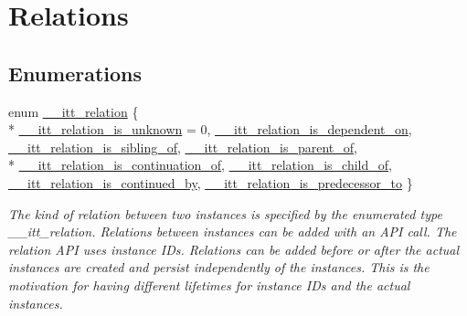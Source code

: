 \hypertarget{group__relations}{\section{Relations}
\label{group__relations}
}
\subsection*{Enumerations}
\begin{DoxyCompactItemize}
\item 
enum \hyperlink{group__relations_ga2f588e0d778ac0cca7cc0b64cfb1bdca}{\-\_\-\-\_\-itt\-\_\-relation} \{ \\*
\hyperlink{group__relations_gga2f588e0d778ac0cca7cc0b64cfb1bdcaa1a459a9e26ce70786921b894dca23272}{\-\_\-\-\_\-itt\-\_\-relation\-\_\-is\-\_\-unknown} = 0, 
\hyperlink{group__relations_gga2f588e0d778ac0cca7cc0b64cfb1bdcaa04baff009ada30040481b41a79f4f593}{\-\_\-\-\_\-itt\-\_\-relation\-\_\-is\-\_\-dependent\-\_\-on}, 
\hyperlink{group__relations_gga2f588e0d778ac0cca7cc0b64cfb1bdcaab47399cff08b5c6b90fd5db7d06f46c2}{\-\_\-\-\_\-itt\-\_\-relation\-\_\-is\-\_\-sibling\-\_\-of}, 
\hyperlink{group__relations_gga2f588e0d778ac0cca7cc0b64cfb1bdcaa157629a13cd4b3fda5a0ebaab75fe707}{\-\_\-\-\_\-itt\-\_\-relation\-\_\-is\-\_\-parent\-\_\-of}, 
\\*
\hyperlink{group__relations_gga2f588e0d778ac0cca7cc0b64cfb1bdcaa1e41b50db9c794d31bdcd594993b4b6f}{\-\_\-\-\_\-itt\-\_\-relation\-\_\-is\-\_\-continuation\-\_\-of}, 
\hyperlink{group__relations_gga2f588e0d778ac0cca7cc0b64cfb1bdcaa0996403dd9c42c69163e2c6321d5cf37}{\-\_\-\-\_\-itt\-\_\-relation\-\_\-is\-\_\-child\-\_\-of}, 
\hyperlink{group__relations_gga2f588e0d778ac0cca7cc0b64cfb1bdcaa4d343a796c9e120c638b451d9ce7c001}{\-\_\-\-\_\-itt\-\_\-relation\-\_\-is\-\_\-continued\-\_\-by}, 
\hyperlink{group__relations_gga2f588e0d778ac0cca7cc0b64cfb1bdcaae91984fad33dfb746f08f0db95df3279}{\-\_\-\-\_\-itt\-\_\-relation\-\_\-is\-\_\-predecessor\-\_\-to}
 \}
\begin{DoxyCompactList}\small\item\em The kind of relation between two instances is specified by the enumerated type \-\_\-\-\_\-itt\-\_\-relation. Relations between instances can be added with an A\-P\-I call. The relation A\-P\-I uses instance I\-Ds. Relations can be added before or after the actual instances are created and persist independently of the instances. This is the motivation for having different lifetimes for instance I\-Ds and the actual instances. \end{DoxyCompactList}\end{DoxyCompactItemize}
